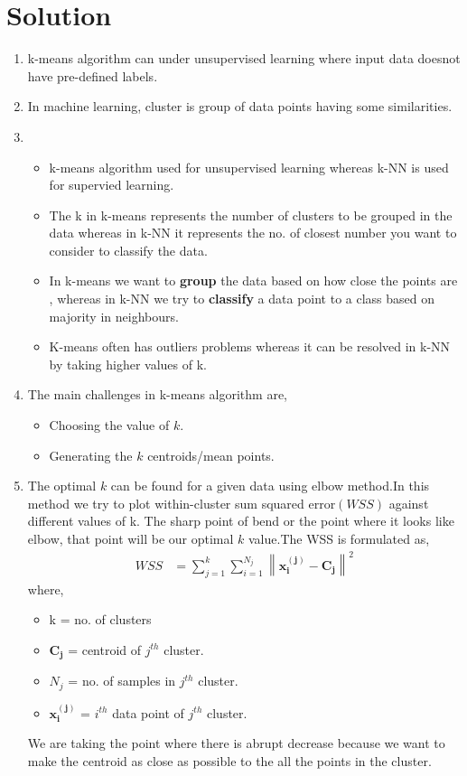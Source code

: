 \documentclass[journal,12pt,onecolumn]{IEEEtran}
\providecommand{\brak}[1]{\ensuremath{\left(#1\right)}}
\theoremstyle{remark}
\providecommand{\norm}[1]{\left\lVert#1\right\rVert}
\numberwithin{equation}{section}
\let\vec\mathbf
\begin{document}
	     \section{Solution}
		     \begin{enumerate}
		       \item k-means algorithm can under unsupervised learning where input data doesnot have pre-defined labels.
		       \item In machine learning, cluster is group of data points having some similarities.
		       \item 
			      \begin{itemize}
			        \item k-means algorithm used for unsupervised learning whereas k-NN is used for supervied learning.
			        \item The k in k-means represents the number of clusters to be grouped in the data whereas in k-NN it represents the no. of closest number you want to consider to classify the data.
			        \item In k-means we want to \textbf{group} the data based on how close the points are , whereas in k-NN we try to \textbf{classify} a data point to a class based on majority in neighbours.
				\item K-means often has outliers problems whereas it can be resolved in k-NN by taking higher values of k.
			      \end{itemize}
		       \item The main challenges in k-means algorithm are,
			       \begin{itemize}
				 \item Choosing the value of $k$.
			         \item Generating the $k$ centroids/mean points.
			       \end{itemize}
		       \item The optimal $k$ can be found for a given data using elbow method.In this method we try to plot within-cluster sum squared error$\brak{WSS}$ against different values of k. The sharp point of bend or the point where it looks like elbow, that point will be our optimal $k$ value.The WSS is formulated as,
			        \begin{align}
					WSS &= \sum_{j=1}^{k}\sum_{i=1}^{N_j}\norm{\vec{x_i^{\brak{j}}} -\vec{C_j}}^{2}
			        \end{align}
				     where,
				     \begin{itemize}
				       \item k = no. of clusters
				       \item $\vec{C_j}$ = centroid of $j^{th}$ cluster.
				       \item $N_j$ = no. of samples in $j^{th}$ cluster.\\
				       \item $\vec{x_i^{\brak{j}}}$ =  $i^{th}$ data point of $j^{th}$ cluster.
				     \end{itemize}
		We are taking the point where there is abrupt decrease because we want to make the centroid as close as possible to the all the points in the cluster.
		      \end{enumerate}
         
\end{document}
